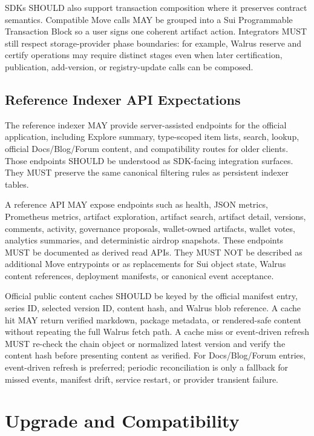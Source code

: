 \documentclass[11pt]{article}
\begin{document}
SDKs SHOULD also support transaction composition where it preserves contract
semantics. Compatible Move calls MAY be grouped into a Sui Programmable
Transaction Block so a user signs one coherent artifact action. Integrators
MUST still respect storage-provider phase boundaries: for example, Walrus
reserve and certify operations may require distinct stages even when later
certification, publication, add-version, or registry-update calls can be
composed.

\subsection{Reference Indexer API Expectations}

The reference indexer MAY provide server-assisted endpoints for the official
application, including Explore summary, type-scoped item lists, search, lookup,
official Docs/Blog/Forum content, and compatibility routes for older clients.
Those endpoints SHOULD be understood as SDK-facing integration surfaces. They
MUST preserve the same canonical filtering rules as persistent indexer tables.

A reference API MAY expose endpoints such as health, JSON metrics, Prometheus
metrics, artifact exploration, artifact search, artifact detail, versions,
comments, activity, governance proposals, wallet-owned artifacts, wallet votes,
analytics summaries, and deterministic airdrop snapshots. These endpoints MUST
be documented as derived read APIs. They MUST NOT be described as additional
Move entrypoints or as replacements for Sui object state, Walrus content
references, deployment manifests, or canonical event acceptance.

Official public content caches SHOULD be keyed by the official manifest entry,
series ID, selected version ID, content hash, and Walrus blob reference. A cache
hit MAY return verified markdown, package metadata, or rendered-safe content
without repeating the full Walrus fetch path. A cache miss or event-driven
refresh MUST re-check the chain object or normalized latest version and verify
the content hash before presenting content as verified. For Docs/Blog/Forum
entries, event-driven refresh is preferred; periodic reconciliation is only a
fallback for missed events, manifest drift, service restart, or provider
transient failure.

\section{Upgrade and Compatibility}
\end{document}
